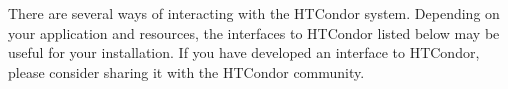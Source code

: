 There are several ways of interacting with the HTCondor system.  Depending on
your application and resources, the interfaces to HTCondor listed below may be
useful for your installation. If you have developed an interface to HTCondor,
please consider sharing it with the HTCondor community.








